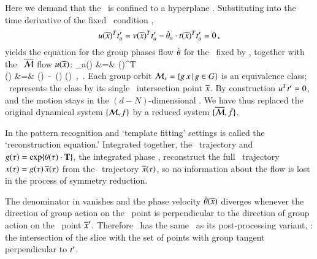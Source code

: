 Here we demand that the \reducedsp\ is confined to a
hyperplane \slice.
Substituting  into the time derivative of
the fixed \slice\ condition ,
\[
u(\overline{x})^T t'_{a} =
v(\overline{x})^T t'_{a} -
\dot{{\bf \theta}}_a \cdot
t(\overline{x})^T  t'_{a}
= 0
    \,,
\]
yields the equation for the group phases flow
$\dot{{\bf \theta}}$
for the \slice\ fixed by \slicep, together with the
\reducedsp\ $\overline{\cal M}$  flow $u(\overline{x})$:
\bea
\dot{\gSpace}_a(\sspRed) &=& 
                       {\groupTan(\sspRed)^T  \sliceTan{} }
\label{MFdtheta}\\
\velRed(\sspRed) &=& \vel(\sspRed)
                    \,-\, \dot{\gSpace}(\sspRed)  \cdot \groupTan(\sspRed)
    \,,\qquad\quad \sspRed \in \pSRed
\,.
\label{EqMotMFrame}
\eea
Each group orbit
${\cal M}_{x} = \{  g \, x \,|\, g \in G \}$
is an equivalence class; \mslices\ represents the class by
its single \slice\ intersection point $\overline{x}$. By
construction $u^T t'_{} = 0$, and  the motion
stays in the $(d\!-\!N)$-dim\-ens\-ion\-al \slice. We have
thus replaced the original dynamical system $\{{\cal M},f\}$ by a reduced
system $\{\overline{\cal M},\bar{f}\}$.

In the pattern recognition and `template fitting' settings
 is called the `reconstruction equation.'
Integrated together, the \reducedsp\ trajectory
 and
$g(\tau)=\exp\{{\bf \theta}(\tau) \cdot \mathbf{T} \}$,
the integrated phase
, reconstruct the full \statesp\ trajectory
$x(\tau)= g(\tau)\,\overline{x}(\tau)$ from the
\reducedsp\  trajectory $\overline{x}(\tau)$, so no information
about the flow is lost in the process of symmetry reduction.

The denominator in
 vanishes and the phase velocity
$\dot{{\bf \theta}}(\overline{x})$ diverges whenever the direction of
group action on the \reducedsp\ point is perpendicular to the
direction of group action on the \slice\ point ${\overline{x}'}$.
Therefore \mslices\ has the same \sset\ as its
post-processing variant, \mframes: the intersection of the slice
with the set of points with group tangent perpendicular to $t'_{}$.

